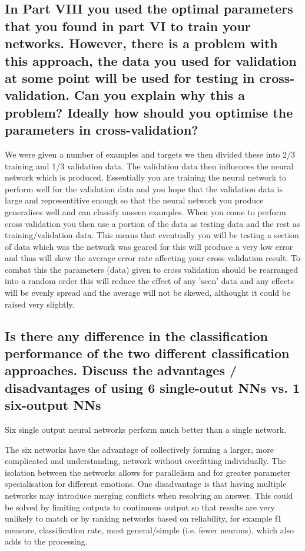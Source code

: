 \documentclass[11pt]{article}
\begin{document}
\subsection{In Part VIII you used the optimal parameters that you found in part VI to train your networks. However, there is a problem with this approach, the data you used for validation at some point will be used for testing in cross-validation. Can you explain why this a problem? Ideally how should you optimise the parameters in cross-validation?}

We were given a number of examples and targets we then divided these into  2/3 training and 1/3 validation data. The validation data then influences the neural network which is produced. Essentially you are training the neural network to perform well for the validation data and you hope that the validation data is large and representitive enough so that the neural network you produce generalises well and can classify unseen examples. When you come to perform cross validation you then use a portion of the data as testing data and the rest as training/validation data. This means that eventually you will be testing a section of data which was the network was geared for this will produce a very low error and thus will skew the average error rate affecting your cross validation result. To combat this the parameters (data) given to cross validation should be rearranged into a random order this will reduce the effect of any 'seen' data and any effects will be evenly spread and the average will not be skewed, althought it could be raised very slightly.

\subsection{Is there any difference in the classification performance of the two different classification approaches. Discuss the advantages / disadvantages of using 6 single-outut NNs vs. 1 six-output NNs}

Six single output neural networks perform much better than a single network. 

The six networks have the advantage of collectively forming a larger, more complicated and understanding, network without overfitting individually. The isolation between the networks allows for parallelism and for greater parameter specialisation for different emotions. One disadvantage is that having multiple networks may introduce merging conflicts when resolving an answer. This could be solved by limiting outputs to continuous output so that results are very unlikely to match or by ranking networks based on reliability, for example f1 measure, classification rate, most general/simple (i.e. fewer neurons), which also adds to the processing.
\end{document}
